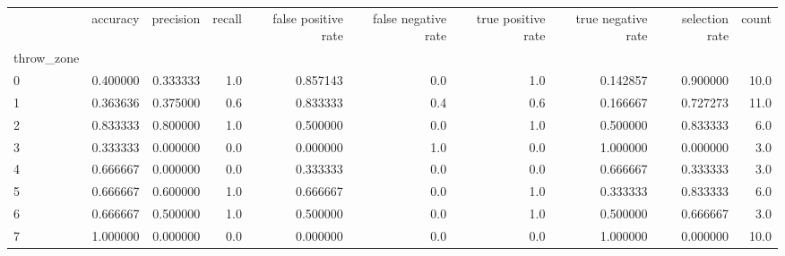 \begin{tabular}{lrrrrrrrrr}
\toprule
{} &  accuracy &  precision &  recall &  false positive rate &  false negative rate &  true positive rate &  true negative rate &  selection rate &  count \\
throw\_zone &           &            &         &                      &                      &                     &                     &                 &        \\
\midrule
0          &  0.400000 &   0.333333 &     1.0 &             0.857143 &                  0.0 &                 1.0 &            0.142857 &        0.900000 &   10.0 \\
1          &  0.363636 &   0.375000 &     0.6 &             0.833333 &                  0.4 &                 0.6 &            0.166667 &        0.727273 &   11.0 \\
2          &  0.833333 &   0.800000 &     1.0 &             0.500000 &                  0.0 &                 1.0 &            0.500000 &        0.833333 &    6.0 \\
3          &  0.333333 &   0.000000 &     0.0 &             0.000000 &                  1.0 &                 0.0 &            1.000000 &        0.000000 &    3.0 \\
4          &  0.666667 &   0.000000 &     0.0 &             0.333333 &                  0.0 &                 0.0 &            0.666667 &        0.333333 &    3.0 \\
5          &  0.666667 &   0.600000 &     1.0 &             0.666667 &                  0.0 &                 1.0 &            0.333333 &        0.833333 &    6.0 \\
6          &  0.666667 &   0.500000 &     1.0 &             0.500000 &                  0.0 &                 1.0 &            0.500000 &        0.666667 &    3.0 \\
7          &  1.000000 &   0.000000 &     0.0 &             0.000000 &                  0.0 &                 0.0 &            1.000000 &        0.000000 &   10.0 \\
\bottomrule
\end{tabular}
